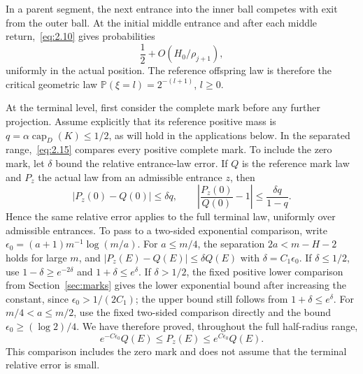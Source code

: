 \documentclass[11pt,letterpaper,reqno]{amsart}
\numberwithin{equation}{section}
\theoremstyle{remark}
\begin{document}
In a parent segment, the next entrance into the inner ball competes with exit from the outer ball. At the initial middle entrance and after each middle return,~\eqref{eq:2.10} gives probabilities
\begin{equation}\label{eq:2.23}
\frac12+O(H_0/\rho_{j+1}),
\end{equation}
uniformly in the actual position. The reference offspring law is therefore the critical geometric law $\mathbb P(\xi=l)=2^{-(l+1)}$, $l\ge0$.

At the terminal level, first consider the complete mark before any further projection. Assume explicitly that its reference positive mass is $q=\alpha\operatorname{cap}_D(K)\le1/2$, as will hold in the applications below. In the separated range,~\eqref{eq:2.15} compares every positive complete mark. To include the zero mark, let $\delta$ bound the relative entrance-law error. If $Q$ is the reference mark law and $P_z$ the actual law from an admissible entrance $z$, then
\[
|P_z(0)-Q(0)|\le\delta q,\qquad
\left|\frac{P_z(0)}{Q(0)}-1\right|
\le\frac{\delta q}{1-q}.
\]
Hence the same relative error applies to the full terminal law, uniformly over admissible entrances. To pass to a two-sided exponential comparison, write $\epsilon_0=(a+1)m^{-1}\log(m/a)$. For $a\le m/4$, the separation $2a<m-H-2$ holds for large $m$, and $|P_z(E)-Q(E)|\le\delta Q(E)$ with $\delta=C_1\epsilon_0$. If $\delta\le1/2$, use $1-\delta\ge e^{-2\delta}$ and $1+\delta\le e^\delta$. If $\delta>1/2$, the fixed positive lower comparison from Section~\ref{sec:marks} gives the lower exponential bound after increasing the constant, since $\epsilon_0>1/(2C_1)$; the upper bound still follows from $1+\delta\le e^\delta$. For $m/4<a\le m/2$, use the fixed two-sided comparison directly and the bound $\epsilon_0\ge(\log2)/4$. We have therefore proved, throughout the full half-radius range,
\[
e^{-C\epsilon_0}Q(E)\le P_z(E)\le e^{C\epsilon_0}Q(E).
\]
This comparison includes the zero mark and does not assume that the terminal relative error is small.
\end{document}

